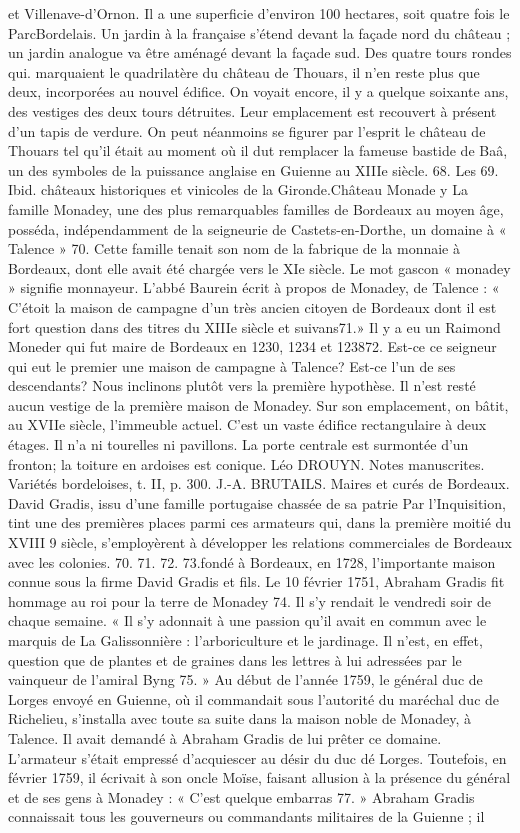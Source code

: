 et Villenave-d'Ornon. Il a une superficie d'environ 100 hectares, soit quatre fois le ParcBordelais. Un jardin à la française s'étend devant la façade nord du château ; un jardin analogue va être aménagé devant la façade sud. Des quatre tours rondes qui. marquaient le quadrilatère du château de Thouars, il n'en reste plus que deux, incorporées au nouvel édifice. On voyait encore, il y a quelque soixante ans, des vestiges des deux tours détruites. Leur emplacement est recouvert à présent d'un tapis de verdure. On peut néanmoins se figurer par l'esprit le château de Thouars tel qu'il était au moment où il dut remplacer la fameuse bastide de Baâ, un des symboles de la puissance anglaise en Guienne au XIIIe siècle. 68. Les 69. Ibid. châteaux historiques et vinicoles de la Gironde.Château Monade y La famille Monadey, une des plus remarquables familles de Bordeaux au moyen âge, posséda, indépendamment de la seigneurie de Castets-en-Dorthe, un domaine à « Talence » 70. Cette famille tenait son nom de la fabrique de la monnaie à Bordeaux, dont elle avait été chargée vers le XIe siècle. Le mot gascon « monadey » signifie monnayeur. L'abbé Baurein écrit à propos de Monadey, de Talence : « C'étoit la maison de campagne d'un très ancien citoyen de Bordeaux dont il est fort question dans des titres du XIIIe siècle et suivans71.» Il y a eu un Raimond Moneder qui fut maire de Bordeaux en 1230, 1234 et 123872. Est-ce ce seigneur qui eut le premier une maison de campagne à Talence? Est-ce l'un de ses descendants? Nous inclinons plutôt vers la première hypothèse. Il n'est resté aucun vestige de la première maison de Monadey. Sur son emplacement, on bâtit, au XVIIe siècle, l'immeuble actuel. C'est un vaste édifice rectangulaire à deux étages. Il n'a ni tourelles ni pavillons. La porte centrale est surmontée d'un fronton; la toiture en ardoises est conique. Léo DROUYN. Notes manuscrites. Variétés bordeloises, t. II, p. 300. J.-A. BRUTAILS. Maires et curés de Bordeaux. David Gradis, issu d'une famille portugaise chassée de sa patrie Par l'Inquisition, tint une des premières places parmi ces armateurs qui, dans la première moitié du XVIII 9 siècle, s'employèrent à développer les relations commerciales de Bordeaux avec les colonies. 70. 71. 72. 73.fondé à Bordeaux, en 1728, l'importante maison connue sous la firme David Gradis et fils. Le 10 février 1751, Abraham Gradis fit hommage au roi pour la terre de Monadey 74. Il s'y rendait le vendredi soir de chaque semaine. « Il s'y adonnait à une passion qu'il avait en commun avec le marquis de La Galissonnière : l'arboriculture et le jardinage. Il n'est, en effet, question que de plantes et de graines dans les lettres à lui adressées par le vainqueur de l'amiral Byng 75. » Au début de l'année 1759, le général duc de Lorges envoyé en Guienne, où il commandait sous l'autorité du maréchal duc de Richelieu, s'installa avec toute sa suite dans la maison noble de Monadey, à Talence. Il avait demandé à Abraham Gradis de lui prêter ce domaine. L'armateur s'était empressé d'acquiescer au désir du duc dé Lorges. Toutefois, en février 1759, il écrivait à son oncle Moïse, faisant allusion à la présence du général et de ses gens à Monadey : « C'est quelque embarras 77. » Abraham Gradis connaissait tous les gouverneurs ou commandants militaires de la Guienne ; il 